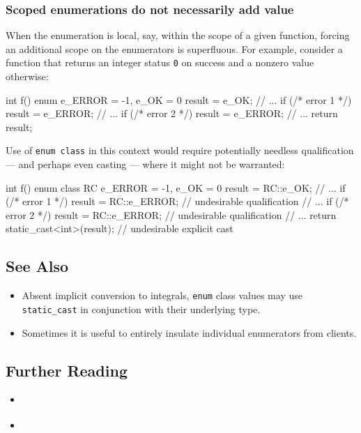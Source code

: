\subsubsection[Scoped enumerations do not necessarily add value]{Scoped enumerations do not necessarily add value}\label{scoped-enumerations-do-not-necessarily-add-value}

When the enumeration is local, say, within the scope of a given
function, forcing an additional scope on the enumerators is superfluous.
For example, consider a function that returns an integer status
\texttt{0} on success and a nonzero value otherwise:

\begin{emcppslisting}[emcppserrorlines={5,7}]
int f()
{
    enum { e_ERROR = -1, e_OK = 0 } result = e_OK;
    // ...
    if (/* error 1 */) { result = e_ERROR; }
    // ...
    if (/* error 2 */) { result = e_ERROR; }
    // ...
    return result;
}
\end{emcppslisting}

\noindent Use of \texttt{enum}~\texttt{class} in this context would require
potentially needless qualification --- and perhaps even casting ---
where it might not be warranted:

\begin{emcppslisting}[emcppserrorlines={5,7}]
int f()
{
    enum class RC { e_ERROR = -1, e_OK = 0 } result = RC::e_OK;
    // ...
    if (/* error 1 */) { result = RC::e_ERROR; } // undesirable qualification
    // ...
    if (/* error 2 */) { result = RC::e_ERROR; } // undesirable qualification
    // ...
    return static_cast<int>(result);  // undesirable explicit cast
}
\end{emcppslisting}

\subsection[See Also]{See Also}\label{see-also}

\begin{itemize}
\item{Absent implicit conversion to integrals, \texttt{enum} class values may use \texttt{static\_cast} in conjunction with their underlying type.}
\item{Sometimes it is useful to entirely insulate individual enumerators from clients.}
\end{itemize}

\subsection[Further Reading]{Further Reading}\label{further-reading}

\begin{itemize}
\item{\cite{miller19}}
\item{\cite{meyers15}}
\end{itemize}


